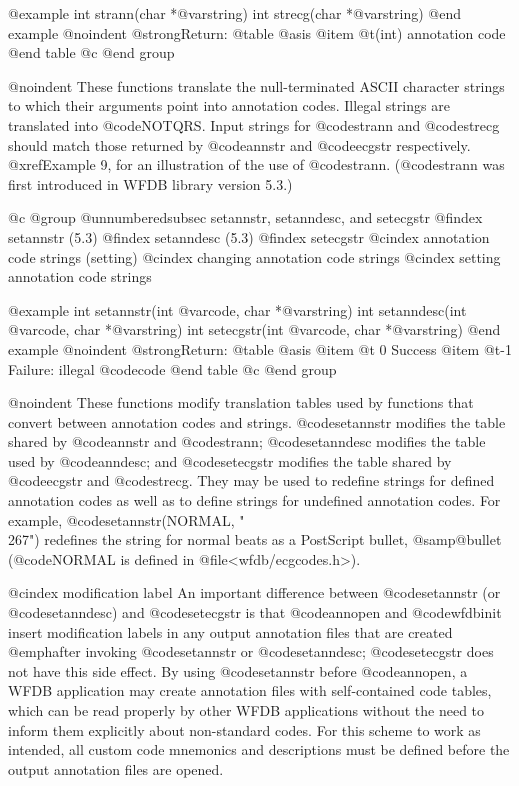 {{{{{{{{{@example
int strann(char *@var{string})
int strecg(char *@var{string})
@end example
@noindent
@strong{Return:}
@table @asis
@item @t{(int)}
annotation code
@end table
@c @end group

@noindent
These functions translate the null-terminated ASCII character strings to
which their arguments point into annotation codes.  Illegal strings are
translated into @code{NOTQRS}.  Input strings for @code{strann} and
@code{strecg} should match those returned by @code{annstr} and
@code{ecgstr} respectively.  @xref{Example 9}, for an illustration of the
use of @code{strann}. (@code{strann} was first introduced in WFDB library
version 5.3.)

@c @group
@unnumberedsubsec setannstr, setanndesc, and setecgstr
@findex setannstr (5.3)
@findex setanndesc (5.3)
@findex setecgstr
@cindex annotation code strings (setting)
@cindex changing annotation code strings
@cindex setting annotation code strings

@example
int setannstr(int @var{code}, char *@var{string})
int setanndesc(int @var{code}, char *@var{string})
int setecgstr(int @var{code}, char *@var{string})
@end example
@noindent
@strong{Return:}
@table @asis
@item @t{ 0}
Success
@item @t{-1}
Failure: illegal @code{code}
@end table
@c @end group

@noindent
These functions modify translation tables used by functions that
convert between annotation codes and strings.  @code{setannstr} modifies
the table shared by @code{annstr} and @code{strann}; @code{setanndesc}
modifies the table used by @code{anndesc}; and @code{setecgstr} modifies
the table shared by @code{ecgstr} and @code{strecg}.  They may be used
to redefine strings for defined annotation codes as well as to define
strings for undefined annotation codes.  For example,
@code{setannstr(NORMAL, "\\267")} redefines the string for normal beats
as a PostScript bullet, @samp{@bullet{}} (@code{NORMAL} is defined in
@file{<wfdb/ecgcodes.h>}).

@cindex modification label
An important difference between @code{setannstr} (or @code{setanndesc})
and @code{setecgstr} is that @code{annopen} and @code{wfdbinit} insert
modification labels in any output annotation files that are created
@emph{after} invoking @code{setannstr} or @code{setanndesc};
@code{setecgstr} does not have this side effect.  By using
@code{setannstr} before @code{annopen}, a WFDB application may create
annotation files with self-contained code tables, which can be read
properly by other WFDB applications without the need to inform them
explicitly about non-standard codes.  For this scheme to work as
intended, all custom code mnemonics and descriptions must be defined
before the output annotation files are opened.

}}}}}}}}}
